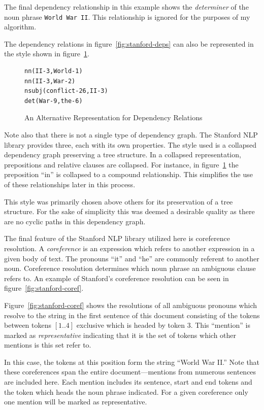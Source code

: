 The final dependency relationship in this example shows the \emph{determiner} of the noun phrase \verb|World War II|.  This relationship is ignored for the purposes of my algorithm.

The dependency relations in figure~\ref{fig:stanford-deps} can also be represented in the style shown in figure~\ref{fig:stanford-alt}.

\begin{figure}
\begin{lstlisting}[language=xml,style=mystyle]
nn(II-3,World-1)
nn(II-3,War-2)
nsubj(conflict-26,II-3)
det(War-9,the-6)
\end{lstlisting}
\caption{An Alternative Representation for Dependency Relations}
\label{fig:stanford-alt}
\end{figure}
Note also that there is not a single type of dependency graph.  The Stanford NLP library provides three, each with its own properties.  The style used is a collapsed dependency graph preserving a tree structure.  In a collapsed representation, prepositions and relative clauses are collapsed.  For instance, in figure~\ref{fig:stanford-alt} the preposition ``in'' is collapsed to a compound relationship.  This simplifies the use of these relationships later in this process.

This style was primarily chosen above others for its preservation of a tree structure.  For the sake of simplicity this was deemed a desirable quality as there are no cyclic paths in this dependency graph.  

The final feature of the Stanford NLP library utilized here is coreference resolution.   A \emph{coreference} is an expression which refers to another expression in a given body of text.  The pronouns ``it'' and ``he'' are commonly referent to another noun.  Coreference resolution determines which noun phrase an ambiguous clause refers to.  An example of Stanford's coreference resolution can be seen in figure~\ref{fig:stanford-coref}.

Figure~\ref{fig:stanford-coref} shows the resolutions of all ambiguous pronouns which resolve to the string in the first sentence of this document consisting of the tokens between tokens $[1..4]$ exclusive which is headed by token 3.  This ``mention'' is marked as \emph{representative} indicating that it is the set of tokens which other mentions is this set refer to.

In this case, the tokens at this position form the string ``World War II.''  Note that these coreferences span the entire document---mentions from numerous sentences are included here.  Each mention includes its sentence, start and end tokens and the token which heads the noun phrase indicated.  For a given coreference only one mention will be marked as representative.

